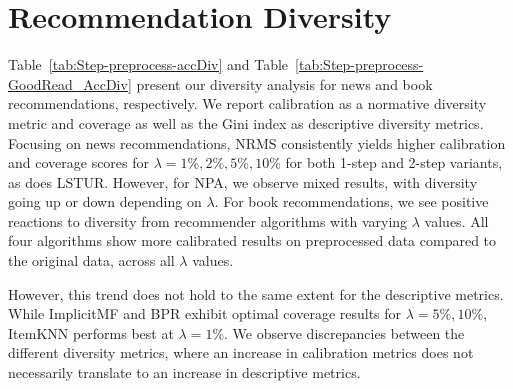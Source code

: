 \documentclass[runningheads]{llncs}
\begin{document}
\section{Recommendation Diversity}
Table~\ref{tab:Step-preprocess-accDiv} and Table~\ref{tab:Step-preprocess-GoodRead_AccDiv} present our diversity analysis for news and book recommendations, respectively.
We report calibration as a normative diversity metric and coverage as well as the Gini index as descriptive diversity metrics. 
Focusing on news recommendations, NRMS consistently yields higher calibration and coverage scores for $\lambda = 1\%, 2\%, 5\%, 10\%$ for both 1-step and 2-step variants, as does LSTUR. 
However, for NPA, we observe mixed results, with diversity going up or down depending on $\lambda$. 
For book recommendations, we see positive reactions to diversity from recommender algorithms with varying $\lambda$ values. 
All four algorithms show more calibrated results on preprocessed data compared to the original data, across all $\lambda$ values. 

However, this trend does not hold to the same extent for the descriptive metrics. 
While ImplicitMF and BPR exhibit optimal coverage results for $\lambda = 5\%, 10\%$, ItemKNN performs best at $\lambda = 1\%$. 
We observe discrepancies between the different diversity metrics, where an increase in calibration metrics does not necessarily translate to an increase in descriptive metrics. 
\end{document}
